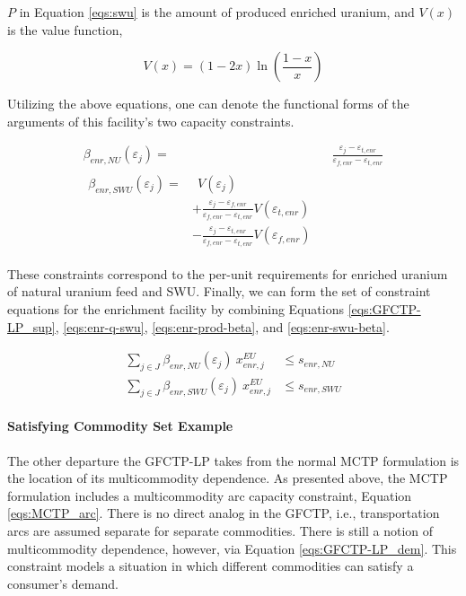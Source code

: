 $P$ in Equation \ref{eqs:swu} is the amount of produced enriched uranium, and
$V(x)$ is the value function,

\begin{equation}\label{eqs:value}
  V(x) = (1-2x) \ln \left(\frac{1-x}{x}\right)
\end{equation}

Utilizing the above equations, one can denote the functional forms of the
arguments of this facility's two capacity constraints.

\begin{align}
\label{eqs:enr-prod-beta}
\beta_{enr,NU}(\varepsilon_{j}) = & \:\: \frac{\varepsilon_{j} - \varepsilon_{t,enr}}
                                      {\varepsilon_{f,enr} - \varepsilon_{t,enr}} \\
\begin{split}
\label{eqs:enr-swu-beta}
\beta_{enr,SWU}(\varepsilon_{j}) = & \:\: V(\varepsilon_{j}) \\
                         & + \frac{\varepsilon_{j} - \varepsilon_{f,enr}}
                                  {\varepsilon_{f,enr} - \varepsilon_{t,enr}} V(\varepsilon_{t,enr}) \\
                         & - \frac{\varepsilon_{j} - \varepsilon_{t,enr}}
                                  {\varepsilon_{f,enr} - \varepsilon_{t,enr}} V(\varepsilon_{f,enr})
\end{split}
\end{align}

These constraints correspond to the per-unit requirements for enriched uranium
of natural uranium feed and SWU. Finally, we can form the set of constraint
equations for the enrichment facility by combining
Equations \ref{eqs:GFCTP-LP_sup}, \ref{eqs:enr-q-swu},
\ref{eqs:enr-prod-beta}, and \ref{eqs:enr-swu-beta}.

\begin{align}
\label{eqs:enr-prod-constr}
\sum_{j \in J}\beta_{enr,NU}(\varepsilon_{j}) \: x_{enr,j}^{EU}  & \leq s_{enr,NU} \\
\label{eqs:enr-swu-constr}
\sum_{j \in J}\beta_{enr,SWU}(\varepsilon_{j}) \: x_{enr,j}^{EU} & \leq s_{enr,SWU}
\end{align}

\paragraph{Satisfying Commodity Set Example}

The other departure the GFCTP-LP takes from the normal MCTP formulation is the
location of its multicommodity dependence. As presented above, the
MCTP formulation includes a multicommodity arc capacity constraint, Equation
\ref{eqs:MCTP_arc}. There is no direct analog in the GFCTP, i.e., transportation
arcs are assumed separate for separate commodities. There is still a notion of
multicommodity dependence, however, via Equation \ref{eqs:GFCTP-LP_dem}. This
constraint models a situation in which different commodities can satisfy a
consumer's demand.

